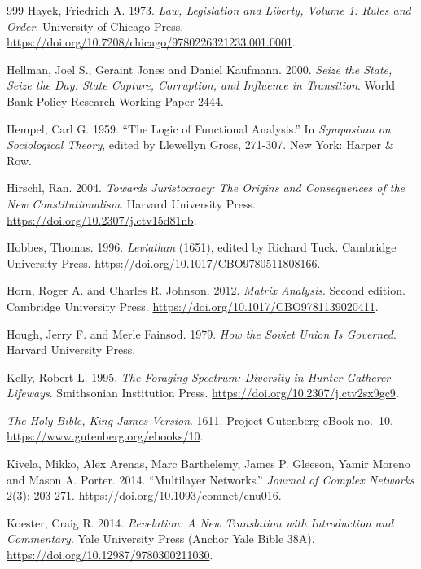 \documentclass[11pt,letterpaper]{article}
\theoremstyle{definition}
\theoremstyle{remark}
\begin{document}
\begin{small}
\begin{thebibliography}{999}
Hayek, Friedrich A. 1973. \emph{Law, Legislation and Liberty, Volume 1: Rules and Order}. University of Chicago Press. \url{https://doi.org/10.7208/chicago/9780226321233.001.0001}.

Hellman, Joel S., Geraint Jones and Daniel Kaufmann. 2000. \emph{Seize the State, Seize the Day: State Capture, Corruption, and Influence in Transition}. World Bank Policy Research Working Paper 2444.

Hempel, Carl G. 1959. ``The Logic of Functional Analysis.'' In \emph{Symposium on Sociological Theory}, edited by Llewellyn Gross, 271-307. New York: Harper \& Row.

Hirschl, Ran. 2004. \emph{Towards Juristocracy: The Origins and Consequences of the New Constitutionalism}. Harvard University Press. \url{https://doi.org/10.2307/j.ctv15d81nb}.

Hobbes, Thomas. 1996. \emph{Leviathan} (1651), edited by Richard Tuck. Cambridge University Press. \url{https://doi.org/10.1017/CBO9780511808166}.

Horn, Roger A. and Charles R. Johnson. 2012. \emph{Matrix Analysis}. Second edition. Cambridge University Press. \url{https://doi.org/10.1017/CBO9781139020411}.

Hough, Jerry F. and Merle Fainsod. 1979. \emph{How the Soviet Union Is Governed}. Harvard University Press.

Kelly, Robert L. 1995. \emph{The Foraging Spectrum: Diversity in Hunter-Gatherer Lifeways}. Smithsonian Institution Press. \url{https://doi.org/10.2307/j.ctv2sx9gc9}.

\emph{The Holy Bible, King James Version}. 1611. Project Gutenberg eBook no.~10. \url{https://www.gutenberg.org/ebooks/10}.

Kivela, Mikko, Alex Arenas, Marc Barthelemy, James P. Gleeson, Yamir Moreno and Mason A. Porter. 2014. ``Multilayer Networks.'' \emph{Journal of Complex Networks} 2(3): 203-271. \url{https://doi.org/10.1093/comnet/cnu016}.

Koester, Craig R. 2014. \emph{Revelation: A New Translation with Introduction and Commentary}. Yale University Press (Anchor Yale Bible 38A). \url{https://doi.org/10.12987/9780300211030}.


\end{thebibliography}
\end{small}
\end{document}
